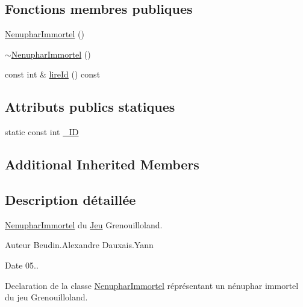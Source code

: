 \subsection*{Fonctions membres publiques}
\begin{DoxyCompactItemize}
\item 
\hyperlink{classgrenouilloland_1_1NenupharImmortel_aa4dd57433beb66c620a5a413bf4ffd49}{Nenuphar\-Immortel} ()
\item 
\hyperlink{classgrenouilloland_1_1NenupharImmortel_a23898629dbe543bfa8e69278389fc7b4}{$\sim$\-Nenuphar\-Immortel} ()
\item 
const int \& \hyperlink{classgrenouilloland_1_1NenupharImmortel_a6fadef66c4d46dea30e0b5ba933ff1d6}{lire\-Id} () const 
\end{DoxyCompactItemize}
\subsection*{Attributs publics statiques}
\begin{DoxyCompactItemize}
\item 
static const int \hyperlink{classgrenouilloland_1_1NenupharImmortel_a1a37a7af6e1296d47556752041b2fe18}{\-\_\-\-I\-D}
\end{DoxyCompactItemize}
\subsection*{Additional Inherited Members}


\subsection{Description détaillée}
\hyperlink{classgrenouilloland_1_1NenupharImmortel}{Nenuphar\-Immortel} du \hyperlink{classgrenouilloland_1_1Jeu}{Jeu} Grenouilloland. 

\begin{DoxyAuthor}{Auteur}
Beudin.\-Alexandre Dauxais.\-Yann 
\end{DoxyAuthor}
\begin{DoxyDate}{Date}
05..
\end{DoxyDate}
Declaration de la classe \hyperlink{classgrenouilloland_1_1NenupharImmortel}{Nenuphar\-Immortel} réprésentant un nénuphar immortel du jeu Grenouilloland. 

